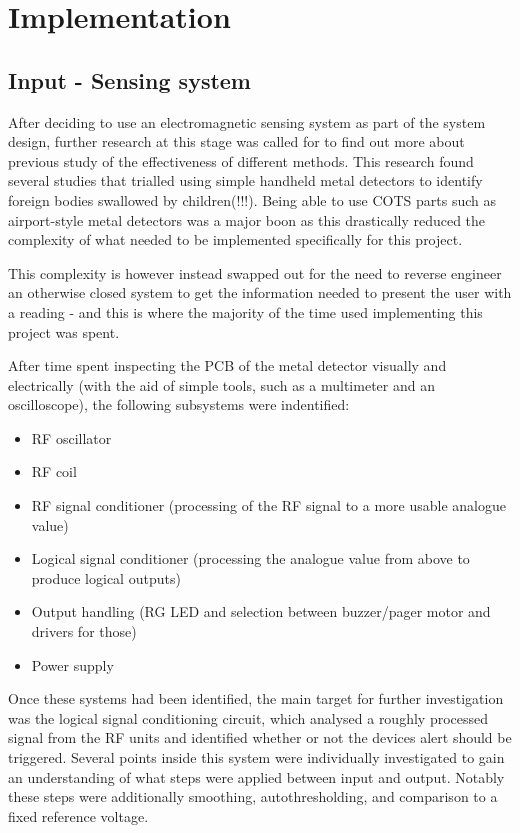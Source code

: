 \documentclass[a4paper]{article}
\begin{document}
    \section{Implementation}
        \subsection{Input - Sensing system}
        After deciding to use an electromagnetic sensing system as part of the system design, further research at this stage was called for to find out more about previous study of the effectiveness of different methods.
        This research found several studies that trialled using simple handheld metal detectors to identify foreign bodies swallowed by children(!!!).
        Being able to use COTS parts such as airport-style metal detectors was a major boon as this drastically reduced the complexity of what needed to be implemented specifically for this project.

        This complexity is however instead swapped out for the need to reverse engineer an otherwise closed system to get the information needed to present the user with a reading - and this is where the majority of the time used implementing this project was spent.

        After time spent inspecting the PCB of the metal detector visually and electrically (with the aid of simple tools, such as a multimeter and an oscilloscope), the following subsystems were indentified:
        \begin{itemize}
            \item RF oscillator
            \item RF coil
            \item RF signal conditioner (processing of the RF signal to a more usable analogue value)
            \item Logical signal conditioner (processing the analogue value from above to produce logical outputs)
            \item Output handling (RG LED and selection between buzzer/pager motor and drivers for those)
            \item Power supply
        \end{itemize}

        Once these systems had been identified, the main target for further investigation was the logical signal conditioning circuit, which analysed a roughly processed signal from the RF units and identified whether or not the devices alert should be triggered.
        Several points inside this system were individually investigated to gain an understanding of what steps were applied between input and output. Notably these steps were additionally smoothing, autothresholding, and comparison to a fixed reference voltage.
        
\end{document}
